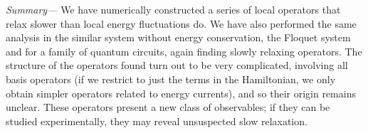 \documentclass[twocolumn,superscriptaddress, prb]{revtex4-1}
\begin{document}




{\it Summary---}
We have numerically constructed a series of local operators that relax slower than local energy fluctuations do.
We have also performed the same analysis in the similar system without energy conservation,
the Floquet system and for a family of quantum circuits, again finding slowly relaxing operators.
The structure of the operators found turn out to be very complicated, involving all basis operators
(if we restrict to just the terms in the Hamiltonian, we only obtain simpler operators related to energy currents),
and so their origin remains unclear.
These operators present a new class of observables; if they can be studied experimentally, they may reveal unsuspected slow relaxation.

\end{document}
